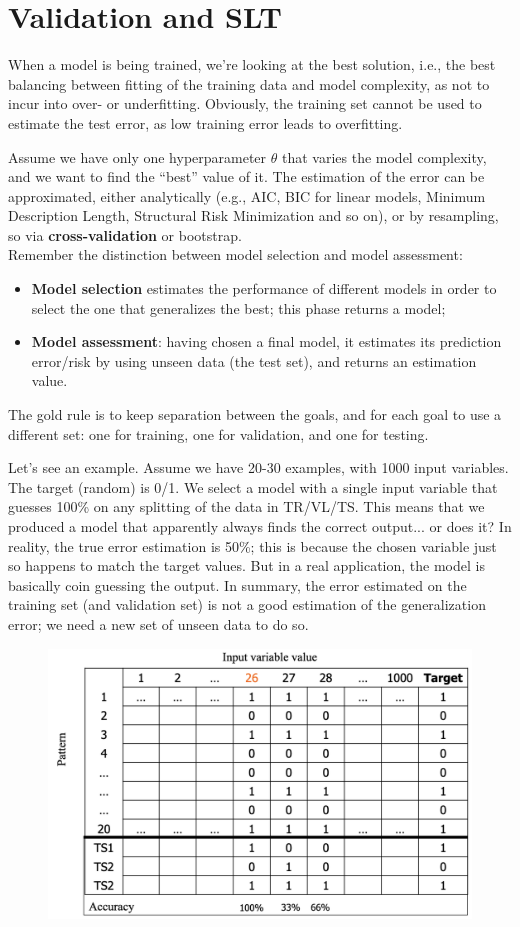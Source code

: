 \chapter{Validation and SLT}

When a model is being trained, we're looking at the best solution, i.e., the best balancing between fitting of the training data and model complexity, as not to incur into over- or underfitting. Obviously, the training set cannot be used to estimate the test error, as low training error leads to overfitting.

Assume we have only one hyperparameter $\theta$ that varies the model complexity, and we want to find the ``best'' value of it. The estimation of the error can be approximated, either analytically (e.g., AIC, BIC for linear models, Minimum Description Length, Structural Risk Minimization and so on), or by resampling, so via \textbf{cross-validation} or bootstrap.\\
Remember the distinction between model selection and model assessment:
\begin{itemize}
    \item \textbf{Model selection} estimates the performance of different models in order to select the one that generalizes the best; this phase returns a model;

    \item \textbf{Model assessment}: having chosen a final model, it estimates its prediction error/risk by using unseen data (the test set), and returns an estimation value.
\end{itemize}
The gold rule is to keep separation between the goals, and for each goal to use a different set: one for training, one for validation, and one for testing.

Let's see an example. Assume we have 20-30 examples, with 1000 input variables. The target (random) is 0/1. We select a model with a single input variable that guesses 100\% on any splitting of the data in TR/VL/TS. This means that we produced a model that apparently always finds the correct output... or does it? In reality, the true error estimation is 50\%; this is because the chosen variable just so happens to match the target values. But in a real application, the model is basically coin guessing the output. In summary, the error estimated on the training set (and validation set) is not a good estimation of the generalization error; we need a new set of unseen data to do so.

\begin{figure}[h]
    \centering\includegraphics[width=0.5\linewidth]{img/table_counterex.png}
\end{figure}

